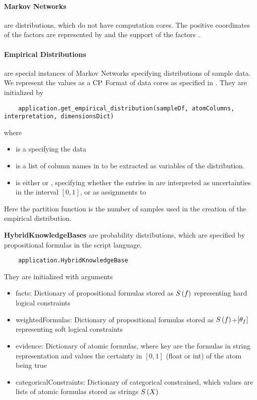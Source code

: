 \paragraph{Markov Networks} are distributions, which do not have computation cores.
The positive coordinates of the factors are represented by  and the support of the factors .

\paragraph{Empirical Distributions} are special instances of Markov Networks specifying distributions of sample data.
We represent the values as a $\mathrm{CP}$ Format of data cores as specified in .
They are initialized by
\begin{lstlisting}
	application.get_empirical_distribution(sampleDf, atomColumns, interpretation, dimensionsDict)
\end{lstlisting}
where
\begin{itemize}
    \item {} is a  specifying the data
    \item {} is a list of column names in  to be extracted as variables of the distribution.
    \item {} is either  or , specifying whether the entries in  are interpreted as uncertainties in the interval $[0,1]$, or as assignments to
\end{itemize}

Here the partition function is the number of samples used in the creation of the empirical distribution.


\textbf{HybridKnowledgeBases} are probability distributions, which are specified by propositional formulas in the script language.
\begin{lstlisting}
	application.HybridKnowledgeBase
\end{lstlisting}
They are initialized with arguments
\begin{itemize}
    \item facts: Dictionary of propositional formulas stored as $S\left(f\right)$ representing hard logical constraints
    \item weightedFormulas: Dictionary of propositional formulas stored as $S\left(f\right)$+$[\theta_{f}]$ representing soft logical constraints
    \item evidence: Dictionary of atomic formulas, where key are the formulas in string representation and values the certainty in $[0,1]$ (float or int) of the atom being true
    \item categoricalConstraints: Dictionary of categorical constrained, which values are lists of atomic formulas stored as strings $S\left(X\right)$
\end{itemize}


